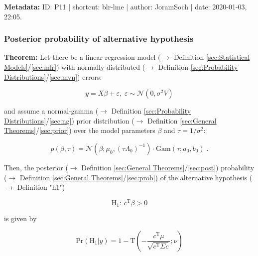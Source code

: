 \documentclass[a4paper,12pt,twoside]{book}
\begin{document}
\vspace{1em}
\textbf{Metadata:} ID: P11 | shortcut: blr-lme | author: JoramSoch | date: 2020-01-03, 22:05.
\vspace{1em}



\subsubsection[\textbf{Posterior probability of alternative hypothesis}]{Posterior probability of alternative hypothesis} \label{sec:blr-pp}
\setcounter{equation}{0}

\textbf{Theorem:} Let there be a linear regression model ($\rightarrow$ Definition \ref{sec:Statistical Models}/\ref{sec:mlr}) with normally distributed ($\rightarrow$ Definition \ref{sec:Probability Distributions}/\ref{sec:mvn}) errors:

\begin{equation} \label{eq:blr-pp-GLM}
y = X \beta + \varepsilon, \; \varepsilon \sim \mathcal{N}(0, \sigma^2 V)
\end{equation}

and assume a normal-gamma ($\rightarrow$ Definition \ref{sec:Probability Distributions}/\ref{sec:ng}) prior distribution ($\rightarrow$ Definition \ref{sec:General Theorems}/\ref{sec:prior}) over the model parameters $\beta$ and $\tau = 1/\sigma^2$:

\begin{equation} \label{eq:blr-pp-GLM-NG-prior}
p(\beta,\tau) = \mathcal{N}(\beta; \mu_0, (\tau \Lambda_0)^{-1}) \cdot \mathrm{Gam}(\tau; a_0, b_0) \; .
\end{equation}

Then, the posterior ($\rightarrow$ Definition \ref{sec:General Theorems}/\ref{sec:post}) probability ($\rightarrow$ Definition \ref{sec:General Theorems}/\ref{sec:prob}) of the alternative hypothesis ($\rightarrow$ Definition "h1")

\begin{equation} \label{eq:blr-pp-GLM-H1}
\mathrm{H}_1: \, c^\mathrm{T} \beta > 0
\end{equation}

is given by

\begin{equation} \label{eq:blr-pp-GLM-NG-PP}
\mathrm{Pr}\left( \mathrm{H}_1 | y \right) = 1 - \mathrm{T}\left( -\frac{c^\mathrm{T} \mu}{\sqrt{c^\mathrm{T} \Sigma c}}; \nu \right)
\end{equation}
\end{document}
